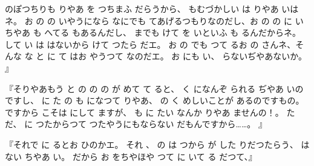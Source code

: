 のぽつちりも
りやあ
を
つちまふ
だらうから、
もむづかしい
は
りやあ
いはネ。
お
の
の
いやうになら
なにでも
てあげるつもりなのだし、お
の
の
に
いちやあ
も
へてる
もあるんだし、
までも
けて
を
いといふ
も
るんだからネ。
して
い
は
はないから
けて
つたら
だエ。
お
の
でも
つて
るお
の
さんネ、そんな
な
と
に
て
はお
やうつて
なのだエ。
お
にも
い、
らないぢやあないか。
』

『そりやあもう
と
の
の
の
が
めて
て
ると、
く
になんぞ
られる
ぢやあ
いのですし、
に
た
の
も
になつて
りやあ、
の
く
めしいことが
あるのですもの。
ですから
こそは
にして
ますが、
も
に
たい
なんか
りやあ
ませんの！。
ただ、
に
つたからつて
つたやうにもならない
だもんですから……。
』

『それで
に
るとお
ひのかエ。
それ
、
の
は
つから
が
した
りだつたらう、
はない
ちやあ
い。
だから
お
をちやほや
つて
に
いて
る
だつて、』

